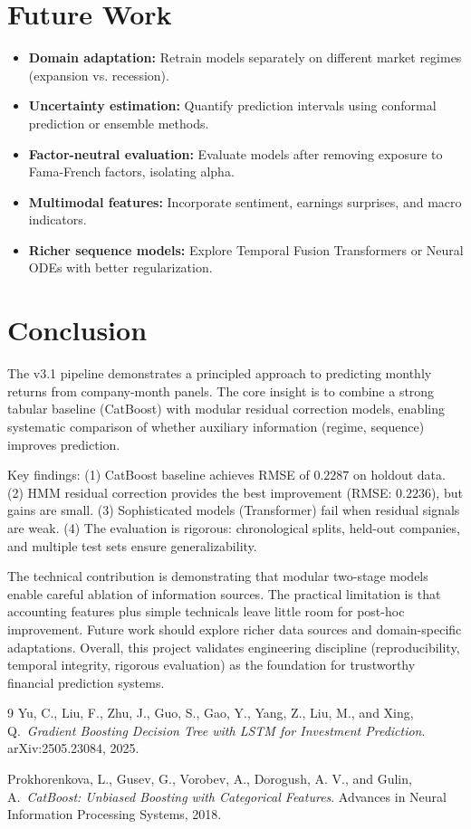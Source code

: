 \documentclass[11pt]{article}
\begin{document}
\section{Future Work}

\begin{itemize}[leftmargin=1.2em]
    \item \textbf{Domain adaptation:} Retrain models separately on different market regimes (expansion vs. recession).
    \item \textbf{Uncertainty estimation:} Quantify prediction intervals using conformal prediction or ensemble methods.
    \item \textbf{Factor-neutral evaluation:} Evaluate models after removing exposure to Fama-French factors, isolating alpha.
    \item \textbf{Multimodal features:} Incorporate sentiment, earnings surprises, and macro indicators.
    \item \textbf{Richer sequence models:} Explore Temporal Fusion Transformers or Neural ODEs with better regularization.
\end{itemize}

\section{Conclusion}

The v3.1 pipeline demonstrates a principled approach to predicting monthly returns from company-month panels. The core insight is to combine a strong tabular baseline (CatBoost) with modular residual correction models, enabling systematic comparison of whether auxiliary information (regime, sequence) improves prediction.

Key findings: (1) CatBoost baseline achieves RMSE of $0.2287$ on holdout data. (2) HMM residual correction provides the best improvement (RMSE: $0.2236$), but gains are small. (3) Sophisticated models (Transformer) fail when residual signals are weak. (4) The evaluation is rigorous: chronological splits, held-out companies, and multiple test sets ensure generalizability.

The technical contribution is demonstrating that modular two-stage models enable careful ablation of information sources. The practical limitation is that accounting features plus simple technicals leave little room for post-hoc improvement. Future work should explore richer data sources and domain-specific adaptations. Overall, this project validates engineering discipline (reproducibility, temporal integrity, rigorous evaluation) as the foundation for trustworthy financial prediction systems.

\begin{thebibliography}{9}
Yu, C., Liu, F., Zhu, J., Guo, S., Gao, Y., Yang, Z., Liu, M., and Xing, Q.\ \textit{Gradient Boosting Decision Tree with LSTM for Investment Prediction}. arXiv:2505.23084, 2025.

Prokhorenkova, L., Gusev, G., Vorobev, A., Dorogush, A. V., and Gulin, A.\ \textit{CatBoost: Unbiased Boosting with Categorical Features}. Advances in Neural Information Processing Systems, 2018.
\end{thebibliography}
\end{document}
